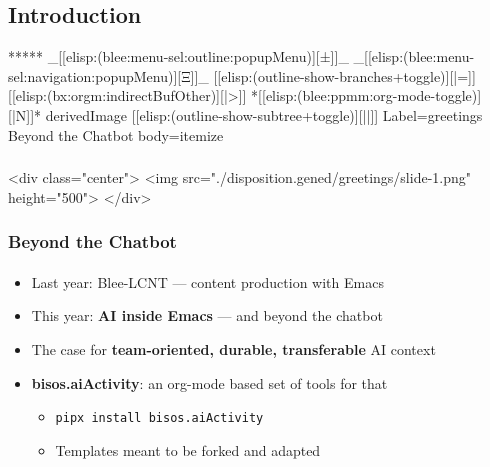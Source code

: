 \begin{whenOrg}
\section{Introduction}

\begin{whenOrg}
*****  _[[elisp:(blee:menu-sel:outline:popupMenu)][±]]_ _[[elisp:(blee:menu-sel:navigation:popupMenu)][Ξ]]_ [[elisp:(outline-show-branches+toggle)][|=]] [[elisp:(bx:orgm:indirectBufOther)][|>]] *[[elisp:(blee:ppmm:org-mode-toggle)][|N]]*  derivedImage [[elisp:(outline-show-subtree+toggle)][||]] Label=greetings Beyond the Chatbot body=itemize
\end{whenOrg}

\begin{htmlonly}

\begin{frame}[fragile,plain,label=greetings]
    \frametitle{}
    \framesubtitle{}
    \begin{rawhtml}
<div class="center">
<img src="./disposition.gened/greetings/slide-1.png" height="500">
</div>
    \end{rawhtml}
\end{frame}
\end{htmlonly}

\begin{verblatex}

\begin{frame}[fragile,plain,label=greetings]
    \frametitle{Beyond the Chatbot}
    \framesubtitle{}

\begin{itemize}
  \item Last year: Blee-LCNT --- content production with Emacs
  \item This year: \textbf{AI inside Emacs} --- and beyond the chatbot
  \item The case for \textbf{team-oriented, durable, transferable} AI context
  \item \textbf{bisos.aiActivity}: an org-mode based set of tools for that
    \begin{itemize}
    \item \texttt{pipx install bisos.aiActivity}
    \item Templates meant to be forked and adapted
    \end{itemize}
  \end{itemize}


\end{frame}
\end{verblatex}
\end{whenOrg}
